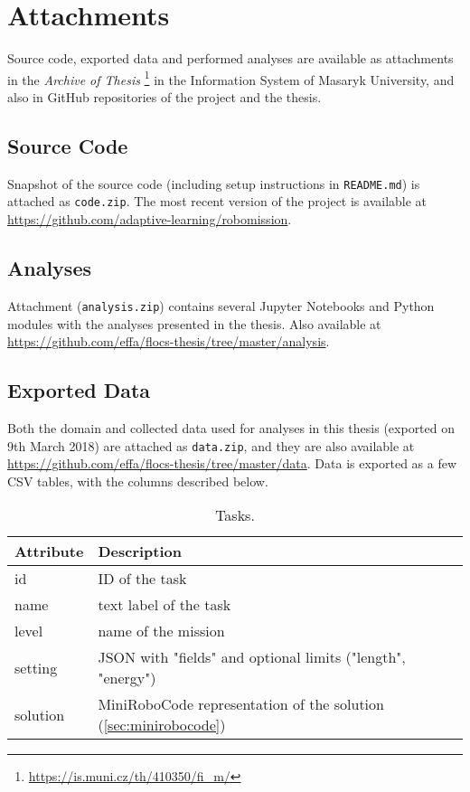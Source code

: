 \chapter{Attachments}
\label{chap:attachments}

Source code, exported data and performed analyses
are available as attachments in the \emph{Archive of Thesis}%
\footnote{\url{https://is.muni.cz/th/410350/fi\_m/}}
in the Information System of Masaryk University,
and also in GitHub repositories of the project and the thesis.

\section{Source Code}
\label{sec:attachment.source-code}

Snapshot of the source code
(including setup instructions in \texttt{README.md})
is attached as \texttt{code.zip}.
The most recent version of the project is available at
\url{https://github.com/adaptive-learning/robomission}.

\section{Analyses}
\label{sec:attachment.analyses}

Attachment (\texttt{analysis.zip})
contains several Jupyter Notebooks and Python modules with the analyses
presented in the thesis.
Also available at
\url{https://github.com/effa/flocs-thesis/tree/master/analysis}.

\section{Exported Data}
\label{sec:attachment.collected-data}

Both the domain and collected data used for analyses in this
thesis (exported on 9th March 2018) are attached as
\texttt{data.zip}, and they are also available at
\url{https://github.com/effa/flocs-thesis/tree/master/data}.
Data is exported as a few CSV tables,
with the columns described below.

\begin{table}[htb]
\centering
\caption{Tasks.}
\begin{tabular}{l l}
\toprule
Attribute & Description \\
\midrule
id & ID of the task \\
name & text label of the task \\
level & name of the mission \\
setting & JSON with "fields" and optional limits ("length", "energy") \\
solution & MiniRoboCode representation of the solution (\cref{sec:minirobocode}) \\
\bottomrule
\end{tabular}
\end{table}

